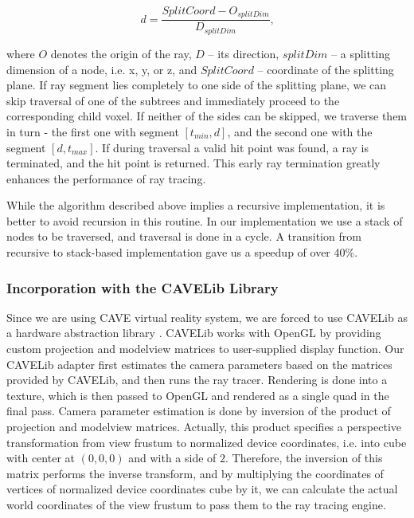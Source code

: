 \documentclass{article}
\begin{document}
$$d = \frac{SplitCoord - O_{splitDim}}{D_{splitDim}}\text{,}$$

where $O$ denotes the origin of the ray, $D$ -- its direction, $splitDim$ -- a splitting dimension of a node, i.e. x, y, or z, and $SplitCoord$ -- coordinate of the splitting plane. If ray segment lies completely to one side of the splitting plane, we can skip traversal of one of the subtrees and immediately proceed to the corresponding child voxel. If neither of the sides can be skipped, we traverse them in turn - the first one with segment $[ t_{min}, d ]$, and the second one with the segment $[ d, t_{max} ]$. If during traversal a valid hit point was found, a ray is terminated, and the hit point is returned. This early ray termination greatly enhances the performance of ray tracing.

While the algorithm described above implies a recursive implementation, it is better to avoid recursion in this routine. In our implementation we use a stack of nodes to be traversed, and traversal is done in a cycle. A transition from recursive to stack-based implementation gave us a speedup of over 40\%.


\subsubsection{Incorporation with the CAVELib Library}
Since we are using CAVE virtual reality system, we are forced to use CAVELib as a hardware abstraction library \cite{cavelib}. CAVELib works with OpenGL by providing custom projection and modelview matrices to user-supplied display function. Our CAVELib adapter first estimates the camera parameters based on the matrices provided by CAVELib, and then runs the ray tracer. Rendering is done into a texture, which is then passed to OpenGL and rendered as a single quad in the final pass. Camera parameter estimation is done by inversion of the product of projection and modelview matrices. Actually, this product specifies a perspective transformation from view frustum to normalized device coordinates, i.e. into cube with center at $(0, 0, 0)$ and with a side of $2$. Therefore, the inversion of this matrix performs the inverse transform, and by multiplying the coordinates of vertices of normalized device coordinates cube by it, we can calculate the actual world coordinates of the view frustum to pass them to the ray tracing engine.

\newpage
\end{document}
